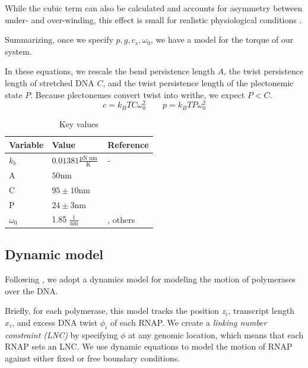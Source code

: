 \documentclass[11pt]{article}
\newcommand{\units}[2]{\frac{\text{#1}}{\text{#2}}\,}
\begin{document}
While the cubic term can also be calculated and accounts for asymmetry between under- and over-winding,  this effect is small for realistic physiological conditions \textcite{markoTorqueDynamicsLinking2007}.


Summarizing, once we specify \(p, g, c_s, \omega_0\), we have a model for the torque of our system.

In these equations, we rescale
the bend persistence length \(A\), the twist persistence length of stretched DNA \(C\), and the twist persistence length of the plectonemic
state \(P\). Because plectonemes convert twist into writhe, we expect \(P < C\).
\[c = k_B T C \omega_0^2 \qquad p = k_B T P \omega_0^2\]

\begin{table}[h]
    \centering
    \begin{tabular}{@{}lll@{}}
        \toprule
        Variable & Value & Reference \\
        \midrule
        \(k_b\) & \(0.01381 \units{pN nm}{K}\) & - \\
        \midrule
        A & \(50\)nm & \parencite{markoTorqueDynamicsLinking2007} \\
        C & \(95 \pm 10\)nm & \parencite{markoTorqueDynamicsLinking2007} \\
        P & \(24 \pm 3\)nm & \parencite{markoTorqueDynamicsLinking2007} \\
        \(\omega_0\) & 1.85 \(\units{1}{nm}\) & \parencite{sevierPropertiesGeneExpression2018}, others \\
        \bottomrule
    \end{tabular}
    \caption{Key values}
    \label{tab:constants}
\end{table}


\subsection{Dynamic model}
Following \textcite{sevierPropertiesGeneExpression2018}, we adopt a dynamics model for modeling the motion of polymerases over the DNA.

Briefly, for each polymerase, this model tracks the position \(z_i\), transcript length \(x_i\), and excess DNA twist \(\phi_i\) of each RNAP. We create a \emph{linking number constraint (LNC)} by specifying \(\phi\) at any genomic location, which means that each RNAP sets an LNC. We use dynamic equations to model the motion of RNAP against either fixed or free boundary conditions.
\end{document}
